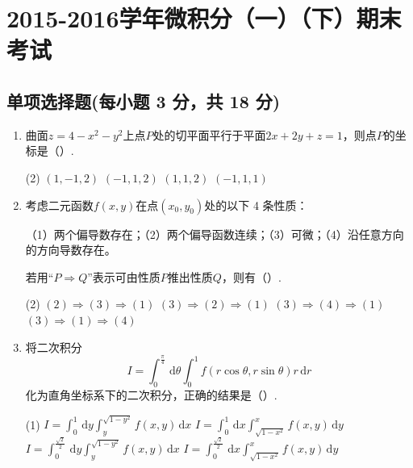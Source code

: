 \documentclass[../Main.tex]{subfiles}
\begin{document}
\chapter{2015-2016学年微积分（一）（下）期末考试}

\section{单项选择题(每小题 3 分，共 18 分)}
\begin{enumerate}
  \item 曲面$z=4-x^{2}-y^{2}$上点$P$处的切平面平行于平面$2x+2y+z=1$，则点$P$的坐标是（\qquad）.

        \begin{tasks}[label=\textbf{\Alph*.}, label-width=1.5em, column-sep=1em](2)
          \task $(1,-1,2)$
          \task $(-1,1,2)$
          \task $(1,1,2)$
          \task $(-1,1,1)$
        \end{tasks}
        \vspace{1em}

  \item 考虑二元函数$f(x,y)$在点$(x_{0},y_{0})$处的以下 4 条性质：

        （1）两个偏导数存在；（2）两个偏导函数连续；（3）可微；（4）沿任意方向的方向导数存在。

        若用“$P\Rightarrow Q$”表示可由性质$P$推出性质$Q$，则有（\qquad）.

        \begin{tasks}[label=\textbf{\Alph*.}, label-width=1.5em, column-sep=1em](2)
          \task $(2)\Rightarrow(3)\Rightarrow(1)$
          \task $(3)\Rightarrow(2)\Rightarrow(1)$
          \task $(3)\Rightarrow(4)\Rightarrow(1)$
          \task $(3)\Rightarrow(1)\Rightarrow(4)$
        \end{tasks}
        \vspace{1em}

  \item 将二次积分
        \[
          I=\int_{0}^{\frac{\pi}{4}}\,\mathrm{d}\theta\int_{0}^{1}f(r\cos\theta,r\sin\theta)r\,\mathrm{d}r
        \]
        化为直角坐标系下的二次积分，正确的结果是（\qquad）.

        \begin{tasks}[label=\textbf{\Alph*.}, label-width=1.5em, column-sep=1em](1)
          \task $\displaystyle I=\int_{0}^{1}\,\mathrm{d}y\int_{y}^{\sqrt{1-y^{2}}}f(x,y)\,\mathrm{d}x$
          \task $\displaystyle I=\int_{0}^{1}\,\mathrm{d}x\int_{\sqrt{1-x^{2}}}^{x}f(x,y)\,\mathrm{d}y$
          \task $\displaystyle I=\int_{0}^{\frac{\sqrt2}{2}}\,\mathrm{d}y\int_{y}^{\sqrt{1-y^{2}}}f(x,y)\,\mathrm{d}x$
          \task $\displaystyle I=\int_{0}^{\frac{\sqrt2}{2}}\,\mathrm{d}x\int_{\sqrt{1-x^{2}}}^{x}f(x,y)\,\mathrm{d}y$
        \end{tasks}
        \vspace{1em}


\end{enumerate}
\end{document}
